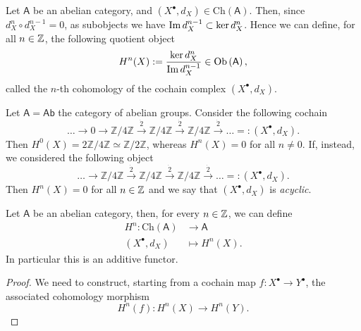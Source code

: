 \begin{defn}[Cohomology]
	Let $\mathsf{A}$ be an abelian category,
	and $\left( X^{\bullet}, d_{X} \right) \in \mathrm{Ch}(\mathsf{A})$.
	Then,  since $d^n_X \circ d^{n-1}_X = 0$, 
	as subobjects we have $\operatorname{Im} d^{n-1}_X \subset \ker d_X^n$.
	Hence we can define, for all $n \in \mathbb{Z}$, the following quotient object
	\begin{equation}
		H^n(X) :=
		\frac{\ker d^n_X}{\operatorname{Im} d_X^{n-1}} \in \mathrm{Ob} \left(\mathsf{A}\right)
	,\end{equation} 
	called the $n$-th cohomology of the cochain complex $\left( X^{\bullet}, d_{X} \right)$.
\end{defn}

\begin{ex}
	Let $\mathsf{A} = \mathsf{Ab}$ the category of abelian groups.
	Consider the following cochain
	\begin{equation}
	\ldots \to 0 \to \mathbb{Z}/4\mathbb{Z} \xrightarrow{\dot{2}} \mathbb{Z}/4\mathbb{Z}
	\xrightarrow{\dot{2}} \mathbb{Z}/4\mathbb{Z} \xrightarrow{\dot{2}} \ldots
	=: \left( X^{\bullet}, d_{X} \right)	
	.\end{equation} 
	Then $H^0(X) = 2\mathbb{Z}/4\mathbb{Z} \simeq \mathbb{Z}/2\mathbb{Z}$, whereas
	$H^n(X) = 0$ for all $n \neq 0$.
	If, instead, we considered the following object
	\begin{equation}
	\ldots \to \mathbb{Z}/4\mathbb{Z} \xrightarrow{\dot{2}} \mathbb{Z}/4\mathbb{Z}
	\xrightarrow{\dot{2}} \mathbb{Z}/4\mathbb{Z} \xrightarrow{\dot{2}} \ldots
	=: \left( X^{\bullet}, d_{X} \right)	
	.\end{equation} 
	Then $H^n(X) = 0$ for all $n \in \mathbb{Z}$ and we say that 
	$\left( X^{\bullet}, d_{X} \right)$ is \textit{acyclic}.
\end{ex}

\begin{prop}
	Let $\mathsf{A}$ be an abelian category, then, for every $n \in \mathbb{Z}$, we can define 
	\begin{align}
		H^n: \mathrm{Ch}(\mathsf{A}) &\to \mathsf{A} \\
		\left( X^{\bullet}, d_{X} \right) &\mapsto H^n(X)
	.\end{align}
	In particular this is an additive functor.
\end{prop} 
\begin{proof}
	We need to construct, starting from a cochain map $f: X^{\bullet} \to Y^{\bullet}$, the associated cohomology morphism
	\begin{equation}
		H^n(f): H^n(X) \to H^n(Y)
	.\end{equation} 
\end{proof}

